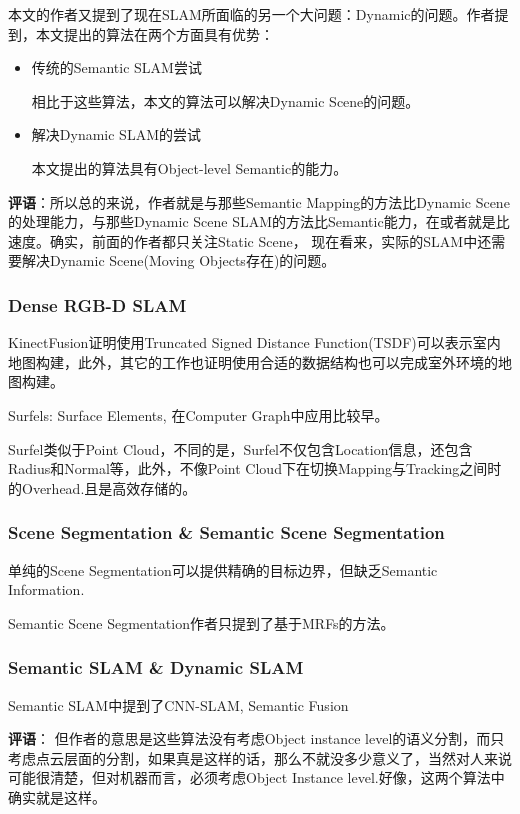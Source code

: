 本文的作者又提到了现在SLAM所面临的另一个大问题：Dynamic的问题。作者提到，本文提出的算法在两个方面具有优势：
\begin{itemize}
\item 传统的Semantic SLAM尝试

相比于这些算法，本文的算法可以解决Dynamic Scene的问题。

\item 解决Dynamic SLAM的尝试

本文提出的算法具有Object-level Semantic的能力。

\end{itemize}

{\color{red} \textbf{评语}：所以总的来说，作者就是与那些Semantic Mapping的方法比Dynamic Scene的处理能力，与那些Dynamic Scene SLAM的方法比Semantic能力，在或者就是比速度。确实，前面的作者都只关注Static Scene， 现在看来，实际的SLAM中还需要解决Dynamic Scene(Moving Objects存在)的问题。}

\subsubsection{Dense RGB-D SLAM}

KinectFusion证明使用Truncated Signed Distance Function(TSDF)可以表示室内地图构建，此外，其它的工作也证明使用合适的数据结构也可以完成室外环境的地图构建。

Surfels: Surface Elements, 在Computer Graph中应用比较早。

Surfel类似于Point Cloud，不同的是，Surfel不仅包含Location信息，还包含Radius和Normal等，此外，不像Point Cloud下在切换Mapping与Tracking之间时的Overhead.且是高效存储的。

\subsubsection{Scene Segmentation \& Semantic Scene Segmentation}

单纯的Scene Segmentation可以提供精确的目标边界，但缺乏Semantic Information.

Semantic Scene Segmentation作者只提到了基于MRFs的方法。

\subsubsection{Semantic SLAM \& Dynamic SLAM}

Semantic SLAM中提到了CNN-SLAM, Semantic Fusion

{\color{red} \textbf{评语}： 但作者的意思是这些算法没有考虑Object instance level的语义分割，而只考虑点云层面的分割，如果真是这样的话，那么不就没多少意义了，当然对人来说可能很清楚，但对机器而言，必须考虑Object Instance level.好像，这两个算法中确实就是这样。}

